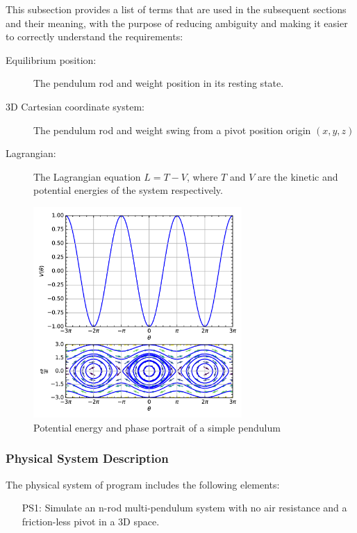 \documentclass[12pt, titlepage]{article}
\begin{document}
This subsection provides a list of terms that are used in the subsequent
sections and their meaning, with the purpose of reducing ambiguity and making
it easier to correctly understand the requirements:

\begin{description}
\item[Equilibrium position:] The pendulum rod and weight position in its 
resting state.
\item[3D Cartesian coordinate system:] The pendulum rod and weight swing from a
pivot position origin $(x,y,z)$
\end{description}

\begin{description}
\item[Lagrangian:] The Lagrangian equation $L=T-V$, where $T$ and $V$ are 
the kinetic and potential energies of the system respectively.
\end{description}

\begin{figure}[H]
	\centering
	\includegraphics[width=300px]{Pendulum_phase_PE.png}
	\caption{Potential energy and phase portrait of a simple 
	pendulum~\citep{WikipediaPendulum}}
	\label{fig:PE-pend}
\end{figure}

\subsubsection{Physical System Description}

The physical system of \progname program includes the following elements:

\begin{itemize}
\item[PS1:] Simulate an n-rod multi-pendulum system with no air
resistance and a friction-less pivot in a 3D space.
\end{itemize}
\end{document}
